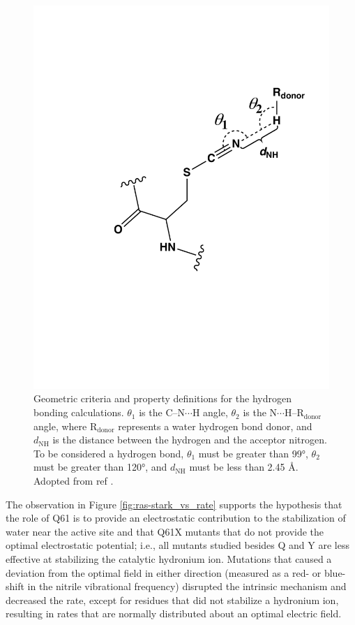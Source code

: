 \begin{figure}
    \center
    \includegraphics[width=\single]{figures-ras/Figure_S4.pdf}
    \caption{
        Geometric criteria and property definitions for the hydrogen bonding calculations. 
        $\theta_1$ is the C--N$\cdots$H angle, $\theta_2$ is the N$\cdots$H--R$_{\text{donor}}$ angle, where R$_{\text{donor}}$ represents a water hydrogen bond donor, and $d_{\text{NH}}$ is the distance between the hydrogen and the acceptor nitrogen. 
        To be considered a hydrogen bond, $\theta_1$ must be greater than \ang{99}, $\theta_2$ must be greater than \ang{120}, and $d_{\text{NH}}$ must be less than 2.45 \si{\angstrom}. 
        Adopted from ref .
    } 
    \label{fig:ras-hbond}
\end{figure}

The observation in Figure \ref{fig:ras-stark_vs_rate} supports the hypothesis that the role of Q61 is to provide an electrostatic contribution to the stabilization of water near the active site and that Q61X mutants that do not provide the optimal electrostatic potential; i.e., all mutants studied besides Q and Y are less effective at stabilizing the catalytic hydronium ion. 
Mutations that caused a deviation from the optimal field in either direction (measured as a red- or blue-shift in the nitrile vibrational frequency) disrupted the intrinsic mechanism and decreased the rate, except for residues that did not stabilize a hydronium ion, resulting in rates that are normally distributed about an optimal electric field.

